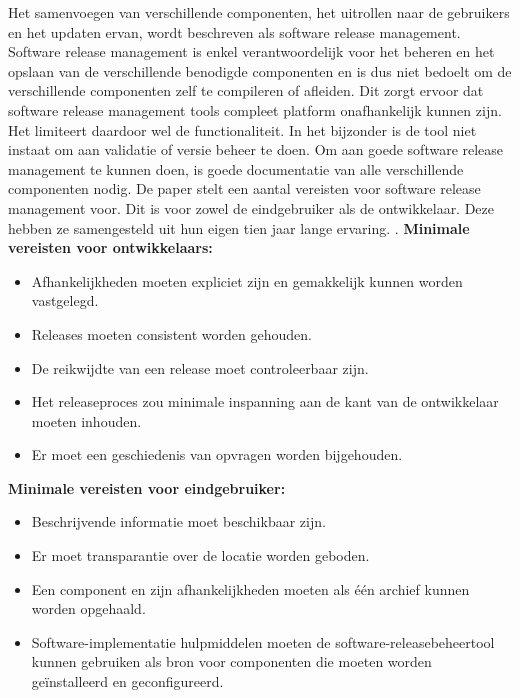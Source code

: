 \newline
\newline
Het samenvoegen van verschillende componenten, het uitrollen naar de gebruikers en het updaten ervan, wordt beschreven als software release management. Software release management is enkel verantwoordelijk voor het beheren en het opslaan van de verschillende benodigde componenten en is dus niet bedoelt om de verschillende componenten zelf te compileren of afleiden. Dit zorgt ervoor dat software release management tools compleet platform onafhankelijk kunnen zijn. Het limiteert daardoor wel de functionaliteit. In het bijzonder is de tool niet instaat om aan validatie of versie beheer te doen.
\newline
\newline
Om aan goede software release management te kunnen doen, is goede documentatie van alle verschillende componenten nodig. De paper stelt een aantal vereisten voor software release management voor. Dit is voor zowel de eindgebruiker als de ontwikkelaar. Deze hebben ze samengesteld uit hun eigen tien jaar lange ervaring. \autocite{Hoek2002}.
\newline
\newline
\textbf{Minimale vereisten voor ontwikkelaars:}
\begin{itemize}
    \item Afhankelijkheden moeten expliciet zijn en gemakkelijk kunnen worden vastgelegd.
    \item Releases moeten consistent worden gehouden.
    \item De reikwijdte van een release moet controleerbaar zijn.
    \item Het releaseproces zou minimale inspanning aan de kant van de ontwikkelaar moeten inhouden.
    \item Er moet een geschiedenis van opvragen worden bijgehouden.
\end{itemize}
\textbf{Minimale vereisten voor eindgebruiker:}
\begin{itemize}
    \item Beschrijvende informatie moet beschikbaar zijn.
    \item Er moet transparantie over de locatie worden geboden.
    \item Een component en zijn afhankelijkheden moeten als één archief kunnen worden opgehaald.
    \item Software-implementatie hulpmiddelen moeten de software-releasebeheertool kunnen gebruiken als bron voor componenten die moeten worden geïnstalleerd en geconfigureerd.
\end{itemize}
